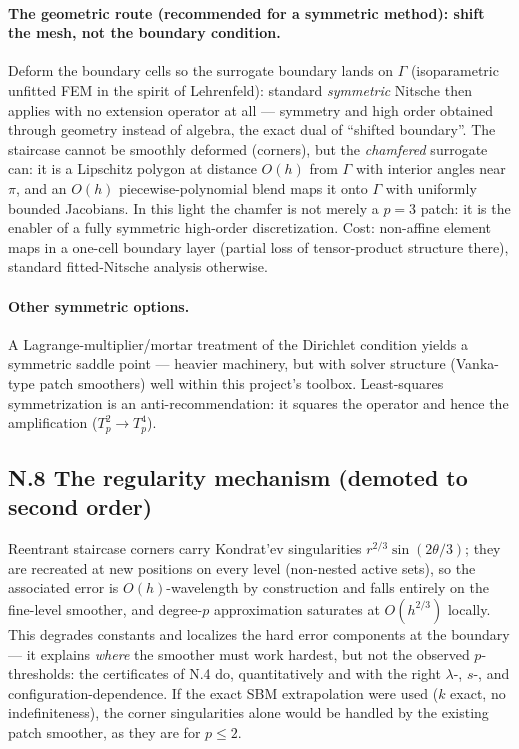 \paragraph{The geometric route (recommended for a symmetric method):
shift the mesh, not the boundary condition.} Deform the boundary cells so
the surrogate boundary lands on $\Gamma$ (isoparametric unfitted FEM in
the spirit of Lehrenfeld): standard \emph{symmetric} Nitsche then applies
with no extension operator at all --- symmetry and high order obtained
through geometry instead of algebra, the exact dual of ``shifted
boundary''. The staircase cannot be smoothly deformed (corners), but the
\emph{chamfered} surrogate can: it is a Lipschitz polygon at distance
$O(h)$ from $\Gamma$ with interior angles near $\pi$, and an $O(h)$
piecewise-polynomial blend maps it onto $\Gamma$ with uniformly bounded
Jacobians. In this light the chamfer is not merely a $p=3$ patch: it is
the enabler of a fully symmetric high-order discretization. Cost:
non-affine element maps in a one-cell boundary layer (partial loss of
tensor-product structure there), standard fitted-Nitsche analysis
otherwise.

\paragraph{Other symmetric options.} A Lagrange-multiplier/mortar
treatment of the Dirichlet condition yields a symmetric saddle point ---
heavier machinery, but with solver structure (Vanka-type patch smoothers)
well within this project's toolbox. Least-squares symmetrization is an
anti-recommendation: it squares the operator and hence the amplification
($T_p^2 \to T_p^4$).

\subsection*{N.8 The regularity mechanism (demoted to second order)}

Reentrant staircase corners carry Kondrat'ev singularities
$r^{2/3}\sin(2\theta/3)$; they are recreated at new positions on every
level (non-nested active sets), so the associated error is $O(h)$-wavelength
by construction and falls entirely on the fine-level smoother, and
degree-$p$ approximation saturates at $O(h^{2/3})$ locally. This degrades
constants and localizes the hard error components at the boundary --- it
explains \emph{where} the smoother must work hardest, but not the observed
$p$-thresholds: the certificates of N.4 do, quantitatively and with the
right $\lambda$-, $s$-, and configuration-dependence. If the exact SBM
extrapolation were used ($k$ exact, no indefiniteness), the corner
singularities alone would be handled by the existing patch smoother, as
they are for $p \le 2$.

